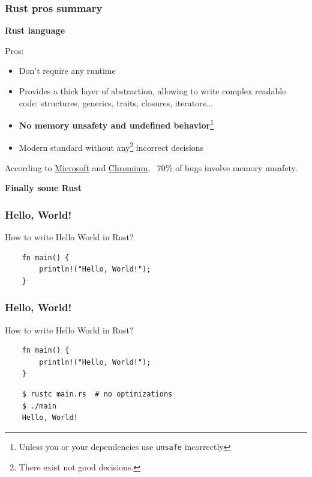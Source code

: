 \documentclass[aspectratio=1610,t]{beamer}
\begin{document}

\begin{frame}
\frametitle{Rust pros summary}
\textbf{Rust language}

Pros:
\begin{itemize}
    \item Don't require any runtime
    \item Provides a thick layer of abstraction, allowing to write complex readable code: structures, generics, traits, closures, iterators...
    \item \textbf{No memory unsafety and undefined behavior}\footnote{Unless you or your dependencies use \texttt{unsafe} incorrectly}
    \item Modern standard without any\footnote{There exist not good decisions.} incorrect decisions
\end{itemize}

According to \href{https://www.zdnet.com/article/microsoft-70-percent-of-all-security-bugs-are-memory-safety-issues/}{Microsoft} and \href{https://www.chromium.org/Home/chromium-security/memory-safety}{Chromium}, ~70\% of bugs involve memory unsafety.
\end{frame}


\begin{frame}[c]
\centering\Huge\textbf{Finally some Rust}
\end{frame}


\begin{frame}[fragile]
\frametitle{Hello, World!}

How to write Hello World in Rust?

\begin{verbatim}
    fn main() {
        println!("Hello, World!");
    }
\end{verbatim}
\end{frame}


\begin{frame}[fragile]
\frametitle{Hello, World!}

How to write Hello World in Rust?

\begin{verbatim}
    fn main() {
        println!("Hello, World!");
    }
\end{verbatim}

\begin{verbatim}
    $ rustc main.rs  # no optimizations
    $ ./main
    Hello, World!
\end{verbatim}
\end{frame}
\end{document}

